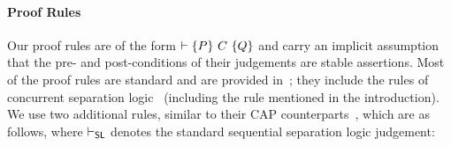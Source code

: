 \paragraph{\textbf{Proof Rules}}
Our proof rules are of the form $\entails \{P\}\ C\ \{Q\}$ and carry
an implicit assumption that the pre- and post-conditions of their
judgements are stable assertions. Most of the proof rules are standard and
are provided in~\cite{colosl-tr14}; they include the rules of concurrent
separation logic~\cite{csl-tcs} (including the \parRule
rule mentioned in the introduction). We use two additional rules,
similar to their CAP counterparts~\cite{cap-ecoop10}, which are as
follows, where $\entails_{\textsf{SL}}$ denotes the standard
sequential separation logic judgement:
\begin{mathpar}

\end{mathpar}


